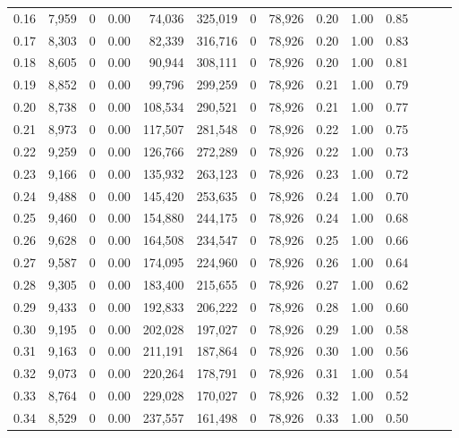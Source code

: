 \begin{tabular}{rrrrrrrrrrrrrr}
0.16 &  7,959 &      0 &  0.00 &   74,036 &  325,019 &       0 &  78,926 &  0.20 &  1.00 &      0.85 \\
0.17 &  8,303 &      0 &  0.00 &   82,339 &  316,716 &       0 &  78,926 &  0.20 &  1.00 &      0.83 \\
0.18 &  8,605 &      0 &  0.00 &   90,944 &  308,111 &       0 &  78,926 &  0.20 &  1.00 &      0.81 \\
0.19 &  8,852 &      0 &  0.00 &   99,796 &  299,259 &       0 &  78,926 &  0.21 &  1.00 &      0.79 \\
0.20 &  8,738 &      0 &  0.00 &  108,534 &  290,521 &       0 &  78,926 &  0.21 &  1.00 &      0.77 \\
0.21 &  8,973 &      0 &  0.00 &  117,507 &  281,548 &       0 &  78,926 &  0.22 &  1.00 &      0.75 \\
0.22 &  9,259 &      0 &  0.00 &  126,766 &  272,289 &       0 &  78,926 &  0.22 &  1.00 &      0.73 \\
0.23 &  9,166 &      0 &  0.00 &  135,932 &  263,123 &       0 &  78,926 &  0.23 &  1.00 &      0.72 \\
0.24 &  9,488 &      0 &  0.00 &  145,420 &  253,635 &       0 &  78,926 &  0.24 &  1.00 &      0.70 \\
0.25 &  9,460 &      0 &  0.00 &  154,880 &  244,175 &       0 &  78,926 &  0.24 &  1.00 &      0.68 \\
0.26 &  9,628 &      0 &  0.00 &  164,508 &  234,547 &       0 &  78,926 &  0.25 &  1.00 &      0.66 \\
0.27 &  9,587 &      0 &  0.00 &  174,095 &  224,960 &       0 &  78,926 &  0.26 &  1.00 &      0.64 \\
0.28 &  9,305 &      0 &  0.00 &  183,400 &  215,655 &       0 &  78,926 &  0.27 &  1.00 &      0.62 \\
0.29 &  9,433 &      0 &  0.00 &  192,833 &  206,222 &       0 &  78,926 &  0.28 &  1.00 &      0.60 \\
0.30 &  9,195 &      0 &  0.00 &  202,028 &  197,027 &       0 &  78,926 &  0.29 &  1.00 &      0.58 \\
0.31 &  9,163 &      0 &  0.00 &  211,191 &  187,864 &       0 &  78,926 &  0.30 &  1.00 &      0.56 \\
0.32 &  9,073 &      0 &  0.00 &  220,264 &  178,791 &       0 &  78,926 &  0.31 &  1.00 &      0.54 \\
0.33 &  8,764 &      0 &  0.00 &  229,028 &  170,027 &       0 &  78,926 &  0.32 &  1.00 &      0.52 \\
0.34 &  8,529 &      0 &  0.00 &  237,557 &  161,498 &       0 &  78,926 &  0.33 &  1.00 &      0.50 \\

\end{tabular}
